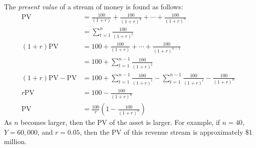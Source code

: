 \documentclass[10pt]{extarticle}
\begin{document}
\begin{description}
      The \textit{present value} of a stream of money is found as follows:
      \begin{align*}
        \text{PV} &= \frac{100}{(1+r)} + \frac{100}{(1+r)^2} + \cdots + \frac{100}{(1+r)^n}\\
                  &= \sum_{t=1}^{n} \frac{100}{(1+r)^t} \tag*{$(1)$}\\
        (1+r)\text{PV} &= 100 + \frac{100}{(1+r)} + \cdots + \frac{100}{(1+r)^{n-1}}\\
                       &= 100 + \sum_{t=1}^{n-1} \frac{100}{(1+r)^t} \tag*{$(2)$}\\
        (1+r)\text{PV} - \text{PV} &= 100 + \sum_{t=1}^{n-1}\frac{100}{(1+r)^t} - \sum_{t=1}^{n-1}\frac{100}{(1+r)^t} - \frac{100}{(1+r)^n}\tag*{$(2)-(1)$}\\
        r\text{PV} &= 100 - \frac{100}{(1+r)^n}\\
        \text{PV} &= \frac{100}{r}\left(1-\frac{100}{(1+r)^n}\right)
      \end{align*}
      As $n$ becomes larger, then the PV of the asset is larger. For example, if $n = 40$, $Y = 60,000$, and $r = 0.05$, then the PV of this revenue stream is approximately \$1 million.\\


\end{description}
\end{document}
